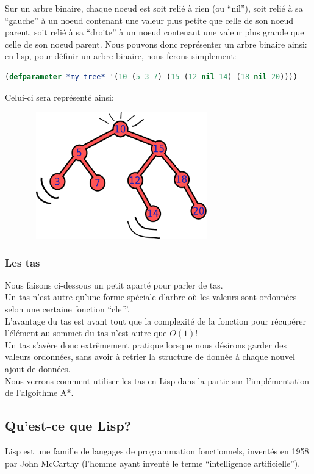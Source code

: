 \documentclass[a4paper, 12pt]{article}
\numberwithin{equation}{subsection}
\begin{document}
Sur un arbre binaire, chaque noeud est soit relié à rien (ou ``nil''), soit relié à sa ``gauche'' à un noeud contenant une valeur plus petite que celle de son noeud parent, soit relié à sa ``droite'' à un noeud contenant une valeur plus grande que celle de son noeud parent. Nous pouvons donc représenter un arbre binaire ainsi: \\

en lisp, pour définir un arbre binaire, nous ferons simplement:
\begin{lstlisting}[language=Lisp]
(defparameter *my-tree* '(10 (5 3 7) (15 (12 nil 14) (18 nil 20))))
\end{lstlisting}
Celui-ci sera représenté ainsi: \\
\begin{figure}[H]
  \centering
  \includegraphics[width=8.0cm, height=5.5cm]{imgs/tree.png}
\end{figure}
\subsubsection{Les tas}
Nous faisons ci-dessous un petit aparté pour parler de tas. \\

Un tas n'est autre qu'une forme spéciale d'arbre où les valeurs sont ordonnées selon une certaine fonction ``clef''. \\

L'avantage du tas est avant tout que la complexité de la fonction pour récupérer l'élément au sommet du tas n'est autre que $O(1)$! \\

Un tas s'avère donc extrêmement pratique lorsque nous désirons garder des valeurs ordonnées, sans avoir à retrier la structure de donnée à chaque nouvel ajout de données. \\

Nous verrons comment utiliser les tas en Lisp dans la partie sur l'implémentation de l'algoithme A*.
\subsection{Qu'est-ce que Lisp?}
Lisp est une famille de langages de programmation fonctionnels, inventés en 1958 par John McCarthy (l'homme ayant inventé le terme ``intelligence artificielle''). \\
\end{document}
